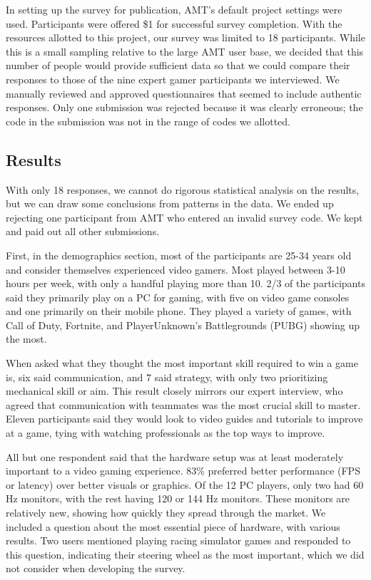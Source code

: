 \documentclass[sigconf]{acmart}
\begin{document}
In setting up the survey for publication, AMT’s default project settings were used. Participants were offered \$1 for successful survey completion. With the resources allotted to this project, our survey was limited to 18 participants. While this is a small sampling relative to the large AMT user base, we decided that this number of people would provide sufficient data so that we could compare their responses to those of the nine expert gamer participants we interviewed. We manually reviewed and approved questionnaires that seemed to include authentic responses. Only one submission was rejected because it was clearly erroneous; the code in the submission was not in the range of codes we allotted.

\subsection{Results}
With only 18 responses, we cannot do rigorous statistical analysis on the results, but we can draw some conclusions from patterns in the data. We ended up rejecting one participant from AMT who entered an invalid survey code. We kept and paid out all other submissions.

First, in the demographics section, most of the participants are 25-34 years old and consider themselves experienced video gamers. Most played between 3-10 hours per week, with only a handful playing more than 10. 2/3 of the participants said they primarily play on a PC for gaming, with five on video game consoles and one primarily on their mobile phone. They played a variety of games, with Call of Duty, Fortnite, and PlayerUnknown's Battlegrounds (PUBG) showing up the most.

When asked what they thought the most important skill required to win a game is, six said communication, and 7 said strategy, with only two prioritizing mechanical skill or aim. This result closely mirrors our expert interview, who agreed that communication with teammates was the most crucial skill to master. Eleven participants said they would look to video guides and tutorials to improve at a game, tying with watching professionals as the top ways to improve. 

All but one respondent said that the hardware setup was at least moderately important to a video gaming experience. 83\% preferred better performance (FPS or latency) over better visuals or graphics. Of the 12 PC players, only two had 60 Hz monitors, with the rest having 120 or 144 Hz monitors. These monitors are relatively new, showing how quickly they spread through the market. We included a question about the most essential piece of hardware, with various results. Two users mentioned playing racing simulator games and responded to this question, indicating their steering wheel as the most important, which we did not consider when developing the survey.
\end{document}
